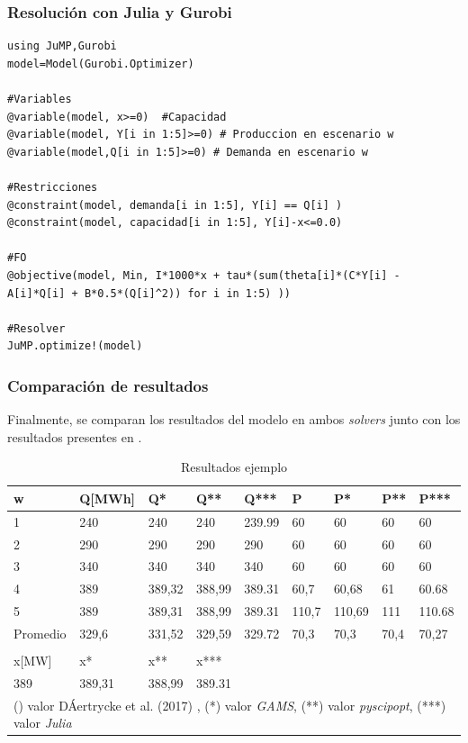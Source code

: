 \subsubsection{Resolución con Julia y Gurobi}\label{ejerciciojulia}
\begin{footnotesize}
\begin{lstlisting}
using JuMP,Gurobi
model=Model(Gurobi.Optimizer)

#Variables
@variable(model, x>=0)  #Capacidad
@variable(model, Y[i in 1:5]>=0) # Produccion en escenario w
@variable(model,Q[i in 1:5]>=0) # Demanda en escenario w

#Restricciones
@constraint(model, demanda[i in 1:5], Y[i] == Q[i] )
@constraint(model, capacidad[i in 1:5], Y[i]-x<=0.0)

#FO
@objective(model, Min, I*1000*x + tau*(sum(theta[i]*(C*Y[i] - A[i]*Q[i] + B*0.5*(Q[i]^2)) for i in 1:5) ))

#Resolver
JuMP.optimize!(model)
\end{lstlisting}
\end{footnotesize}

\subsubsection{Comparación de resultados}

Finalmente, se comparan los resultados del modelo en ambos \textit{solvers} junto con los resultados presentes en .

\begin{table}[H]
\centering
\begin{tabular}{|l|l|l|l|l|l|l|l|l|}
\hline
w & Q{[}MWh{]} & Q* & Q** & Q*** & P & P* & P** & P*** \\ \hline
1 & 240 & 240 & 240 & 239.99 & 60 & 60 & 60 & 60 \\ \hline
2 & 290 & 290 & 290 & 290 & 60 & 60 & 60 & 60 \\ \hline
3 & 340 & 340 & 340 & 340 & 60 & 60 & 60 & 60 \\ \hline
4 & 389 & 389,32 & 388,99 & 389.31 & 60,7 & 60,68 & 61 & 60.68 \\ \hline
5 & 389 & 389,31 & 388,99 & 389.31 & 110,7 & 110,69 & 111 & 110.68 \\ \hline
Promedio & 329,6 & 331,52 & 329,59 & 329.72 & 70,3 & 70,3 & 70,4 & 70,27 \\ \hline
 &  &  &  &  &  &  &  &  \\ \hline
x{[}MW{]} & x* & x** & x*** &  &  &  &  &  \\ \hline
389 & 389,31 & 388,99 & 389.31 &  &  &  &  &  \\ \hline
\multicolumn{9}{l}{\footnotesize 
() valor  DÁertrycke et al. (2017) , (*) valor \textit{GAMS}, (**) valor \textit{pyscipopt}, (***) valor \textit{Julia}}

\end{tabular}
\caption{Resultados ejemplo}
\label{tabla:ejemplos}
\end{table}

